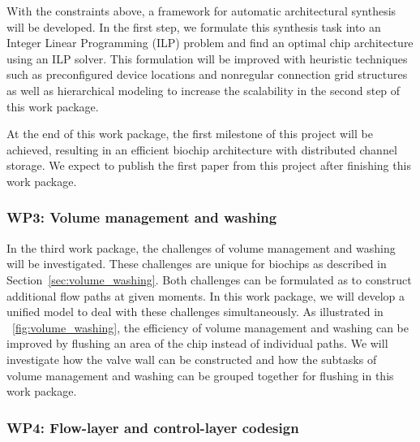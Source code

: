 With the constraints above, a framework for automatic architectural synthesis
will be developed. In the first step, we 
formulate this
synthesis task into an Integer Linear Programming (ILP) problem and 
find an optimal chip architecture using an ILP solver. 
This formulation will be improved with heuristic techniques
such as preconfigured device locations and nonregular connection grid
structures
as well as hierarchical modeling to increase the scalability 
in the second step of this work package. 

At the end of this work package, the first milestone of this
project will be achieved, resulting in an efficient biochip architecture 
with distributed channel storage. 
We expect to publish the first paper from this project after finishing this work
package.

\subsubsection{WP3: Volume management and washing}

In the third work package, the challenges of volume management and washing will be
investigated. These challenges are unique for biochips as described in 
Section~\ref{sec:volume_washing}. Both challenges can be formulated as
to construct additional flow paths at given moments.
In this work package, we will develop a unified model to deal with these challenges
simultaneously. As illustrated in 
\figname~\ref{fig:volume_washing}, the efficiency of volume management and 
washing can be improved by flushing an area of the chip instead of
individual paths. We will investigate how the valve wall can be constructed 
and how the subtasks of volume management and washing can be grouped together 
for flushing in this work package.

\subsubsection{WP4: Flow-layer and control-layer codesign}

